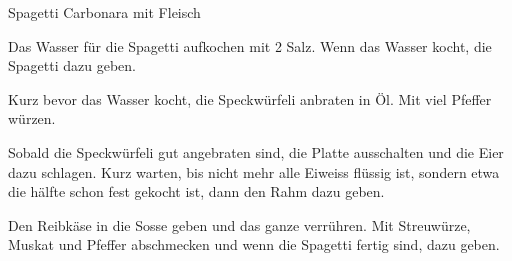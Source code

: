 
\begin{recipe}[]{Spagetti Carbonara mit Fleisch}{}{}



\step
Das Wasser f\"ur die Spagetti aufkochen mit 2 \EL Salz. Wenn das Wasser kocht, die Spagetti dazu geben.

\step
Kurz bevor das Wasser kocht, die Speckw\"urfeli anbraten in \"Ol. Mit viel Pfeffer w\"urzen.

\step
Sobald die Speckw\"urfeli gut angebraten sind, die Platte ausschalten und die Eier dazu schlagen. Kurz warten, bis nicht mehr alle Eiweiss fl\"ussig ist, sondern etwa die h\"alfte schon fest gekocht ist, dann den Rahm dazu geben.

\step
Den Reibk\"ase in die Sosse geben und das ganze verr\"uhren. Mit Streuw\"urze, Muskat und Pfeffer abschmecken und wenn die Spagetti fertig sind, dazu geben.


\end{recipe}